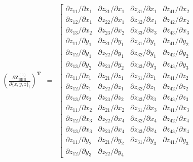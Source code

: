 \documentclass{article}
\begin{document}
\begin{eqnarray}
\left(\frac{
	\partial{\mathbf{Z}^{(0)}_{\mathrm{BBB}}}}{\partial{\{x, y, z\}_i}}
\right)^\mathbf{T}
& = &
\left[\begin{array}{cccc}
\partial{z_{11}} / \partial{x_1} & \partial{z_{21}} / \partial{x_1} &
\partial{z_{31}} / \partial{x_1} & \partial{z_{41}} / \partial{x_2} \\
\partial{z_{12}} / \partial{x_1} & \partial{z_{22}} / \partial{x_1} &
\partial{z_{32}} / \partial{x_1} & \partial{z_{42}} / \partial{x_2} \\
\partial{z_{13}} / \partial{x_2} & \partial{z_{23}} / \partial{x_2} &
\partial{z_{33}} / \partial{x_3} & \partial{z_{43}} / \partial{x_3} \\
\partial{z_{11}} / \partial{y_1} & \partial{z_{21}} / \partial{y_1} &
\partial{z_{31}} / \partial{y_1} & \partial{z_{41}} / \partial{y_2} \\
\partial{z_{12}} / \partial{y_1} & \partial{z_{22}} / \partial{y_1} &
\partial{z_{32}} / \partial{y_1} & \partial{z_{42}} / \partial{y_2} \\
\partial{z_{13}} / \partial{y_2} & \partial{z_{23}} / \partial{y_2} &
\partial{z_{33}} / \partial{y_3} & \partial{z_{43}} / \partial{y_3} \\
\partial{z_{11}} / \partial{z_1} & \partial{z_{21}} / \partial{z_1} &
\partial{z_{31}} / \partial{z_1} & \partial{z_{41}} / \partial{z_2} \\
\partial{z_{12}} / \partial{z_1} & \partial{z_{22}} / \partial{z_1} &
\partial{z_{32}} / \partial{z_1} & \partial{z_{42}} / \partial{z_2} \\
\partial{z_{13}} / \partial{z_2} & \partial{z_{23}} / \partial{z_2} &
\partial{z_{33}} / \partial{z_3} & \partial{z_{43}} / \partial{z_3} \\
\partial{z_{11}} / \partial{x_2} & \partial{z_{21}} / \partial{x_2} &
\partial{z_{31}} / \partial{x_3} & \partial{z_{41}} / \partial{x_3} \\
\partial{z_{12}} / \partial{x_3} & \partial{z_{22}} / \partial{x_4} &
\partial{z_{32}} / \partial{x_4} & \partial{z_{42}} / \partial{x_4} \\
\partial{z_{13}} / \partial{x_3} & \partial{z_{23}} / \partial{x_4} &
\partial{z_{33}} / \partial{x_4} & \partial{z_{43}} / \partial{x_4} \\
\partial{z_{11}} / \partial{y_2} & \partial{z_{21}} / \partial{y_2} &
\partial{z_{31}} / \partial{y_3} & \partial{z_{41}} / \partial{y_3} \\
\partial{z_{12}} / \partial{y_3} & \partial{z_{22}} / \partial{y_4} &

\end{array}
\end{eqnarray}
\end{document}
